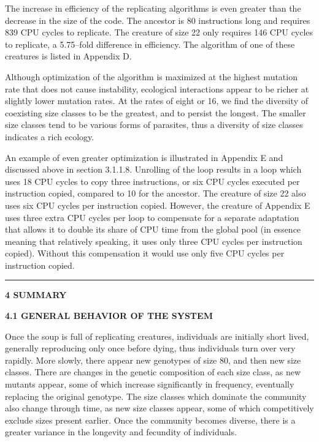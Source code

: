 The increase in efficiency of the replicating algorithms is even greater than
the decrease in the size of the code.  The ancestor is 80 instructions
long and requires 839 CPU cycles to replicate.  The creature of size 22
only requires 146 CPU cycles to replicate, a 5.75--fold difference in
efficiency.  The algorithm of one of these creatures is listed in Appendix D.

Although optimization of the algorithm is maximized at the highest mutation
rate that does not cause instability, ecological interactions appear to be
richer at slightly lower mutation rates.  At the rates of eight or 16, we
find the diversity of coexisting size classes to be the greatest, and to
persist the longest.  The smaller size classes tend to be various forms of
parasites, thus a diversity of size classes indicates a rich ecology.

An example of even greater optimization is illustrated in Appendix E and
discussed above in section 3.1.1.8.  Unrolling of the loop results in a
loop which uses 18 CPU cycles to copy three instructions, or six CPU
cycles executed per instruction copied, compared to 10 for the ancestor.
The creature of size 22 also uses six CPU cycles per instruction copied.
However, the creature of Appendix E uses three extra CPU cycles per loop
to compensate for a separate adaptation that allows it to double its share
of CPU time from the global pool (in essence meaning that relatively speaking,
it uses only three CPU cycles per instruction copied).  Without this
compensation it would use only five CPU cycles per instruction copied.

\LP
\rule[6pt]{6.5in}{1pt}
\large \bf 4 SUMMARY\rm \normalsize
\eLP

\LP
\bf 4.1 GENERAL BEHAVIOR OF THE SYSTEM\rm
\eLP

Once the soup is full of replicating creatures, individuals are initially
short lived, generally reproducing only once before dying, thus individuals
turn over very rapidly.  More slowly, there appear new genotypes of size 80,
and then new size classes.  There are changes in the genetic composition
of each size class, as new mutants appear, some of which increase significantly
in frequency, eventually replacing the original genotype.  The size classes
which dominate the community also change through time, as new size classes
appear, some of which competitively exclude sizes present earlier.
Once the community becomes diverse, there is a greater variance in
the longevity and fecundity of individuals.

